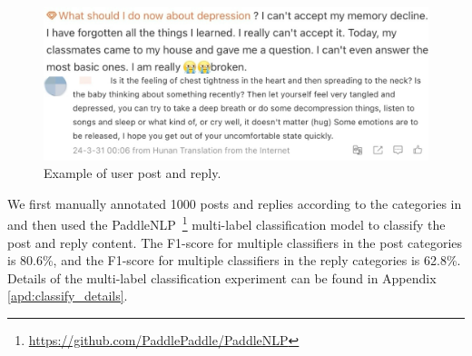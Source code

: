 \begin{figure}[th]
    \centering
    \includegraphics[width=1\columnwidth]{images/postreplyy.jpeg}
    \caption{Example of user post and reply.}
    \label{fig:cases_post_reply}
\end{figure}


We first manually annotated 1000 posts and replies according to the categories in  and then used the PaddleNLP~\footnote{\url{https://github.com/PaddlePaddle/PaddleNLP}} multi-label classification model to classify the post and reply content. The F1-score for multiple classifiers in the post categories is 80.6\%, and the F1-score for multiple classifiers in the reply categories is 62.8\%. Details of the multi-label classification experiment can be found in Appendix \ref{apd:classify_details}. 




